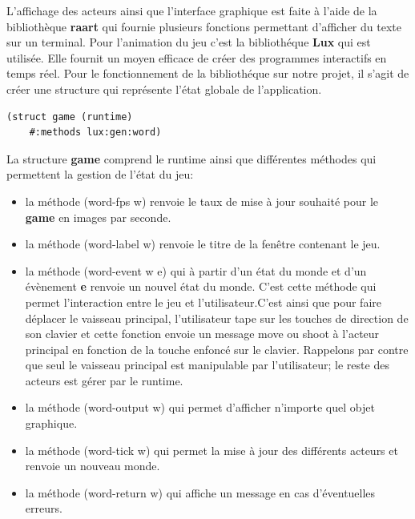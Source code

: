 L'affichage des acteurs ainsi que l'interface graphique est faite à l'aide de la bibliothèque \textbf{raart} qui fournie plusieurs fonctions permettant d'afficher du texte sur un terminal.
Pour l'animation du jeu c'est la bibliothéque \textbf{Lux} qui est utilisée. Elle fournit un moyen efficace de créer des programmes interactifs en temps réel. Pour le fonctionnement de la bibliothéque sur notre projet, il s'agit de créer une structure qui représente l'état globale de l'application.
\begin{lstlisting}[language={lisp},captionpos=b, frame=single]
    (struct game (runtime)
    #:methods lux:gen:word)   
\end{lstlisting}
La structure \textbf{game} comprend le runtime ainsi que différentes méthodes qui permettent la gestion de l'état du jeu:
\\

\begin{itemize}
    \item[\huge *] la méthode (word-fps w) renvoie le taux de mise à jour souhaité pour le \textbf{game} en images par seconde.
    
    \item[\huge *] la méthode (word-label w) renvoie le titre de la fenêtre contenant le jeu.
    
    \item[\huge *] la méthode (word-event w e) qui à partir d'un état du monde et d'un évènement \textbf{e} renvoie un nouvel état du monde. C'est cette méthode qui permet l'interaction entre le jeu et l'utilisateur.C'est ainsi que pour faire déplacer le vaisseau principal, l'utilisateur tape sur les touches de direction de son clavier et cette fonction envoie un message move ou shoot à l'acteur principal en fonction de la touche enfoncé sur le clavier. Rappelons par contre que seul le vaisseau principal est manipulable par l'utilisateur; le reste des acteurs est gérer par le runtime.
    
    \item[\huge *] la méthode (word-output w) qui permet d'afficher n'importe quel objet graphique.
    
    \item[\huge *] la méthode (word-tick w) qui permet la mise à jour des différents acteurs et renvoie un nouveau monde.
    
    \item[\huge *] la méthode (word-return w) qui affiche un message en cas d'éventuelles erreurs.
  \\  
\end{itemize}

